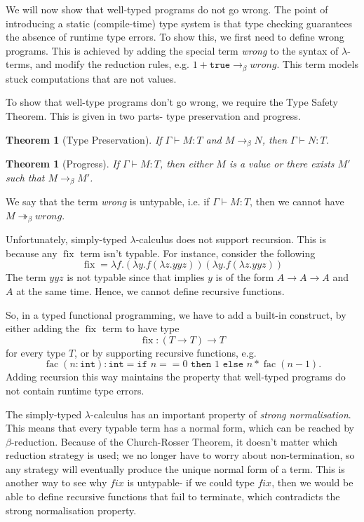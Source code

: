 \documentclass[a4paper, openany]{memoir}
\newtheorem{theorem}[proposition]{Theorem}
\theoremstyle{definition}
\begin{document}
    We will now show that well-typed programs do not go wrong. The point of introducing a static (compile-time) type system is that type checking guarantees the absence of runtime type errors. To show this, we first need to define wrong programs. This is achieved by adding the special term \textit{wrong} to the syntax of $\lambda$-terms, and modify the reduction rules, e.g. $1 + \texttt{true} \to_\beta \textit{wrong}$. This term models stuck computations that are not values.

    To show that well-type programs don't go wrong, we require the Type Safety Theorem. This is given in two parts- type preservation and progress.
    \begin{theorem}[Type Preservation]
        If $\Gamma \vdash M \colon T$ and $M \to_\beta N$, then $\Gamma \vdash N \colon T$.
    \end{theorem}
    \begin{theorem}[Progress]
        If $\Gamma \vdash M \colon T$, then either $M$ is a value or there exists $M'$ such that $M \to_\beta M'$.
    \end{theorem}
    \noindent We say that the term \textit{wrong} is untypable, i.e. if $\Gamma \vdash M \colon T$, then we cannot have $M \twoheadrightarrow_\beta \textit{wrong}$.

    Unfortunately, simply-typed $\lambda$-calculus does not support recursion. This is because any $\operatorname{fix}$ term isn't typable. For instance, consider the following
    \[\operatorname{fix} = \lambda f.(\lambda y.f(\lambda z.yyz))(\lambda y.f(\lambda z.yyz))\]
    The term $yyz$ is not typable since that implies $y$ is of the form $A \to A \to A$ and $A$ at the same time. Hence, we cannot define recursive functions.

    So, in a typed functional programming, we have to add a built-in construct, by either adding the $\operatorname{fix}$ term to have type
    \[\operatorname{fix} \colon (T \to T) \to T\]
    for every type $T$, or by supporting recursive functions, e.g.
    \[\operatorname{fac}(n \colon \texttt{int}) \colon \texttt{int} = \texttt{if } n == 0 \texttt{ then } 1 \texttt{ else } n * \operatorname{fac}(n-1).\]
    Adding recursion this way maintains the property that well-typed programs do not contain runtime type errors.

    The simply-typed $\lambda$-calculus has an important property of \emph{strong normalisation}. This means that every typable term has a normal form, which can be reached by $\beta$-reduction. Because of the Church-Rosser Theorem, it doesn't matter which reduction strategy is used; we no longer have to worry about non-termination, so any strategy will eventually produce the unique normal form of a term. This is another way to see why $fix$ is untypable- if we could type $fix$, then we would be able to define recursive functions that fail to terminate, which contradicts the strong normalisation property.
\end{document}
